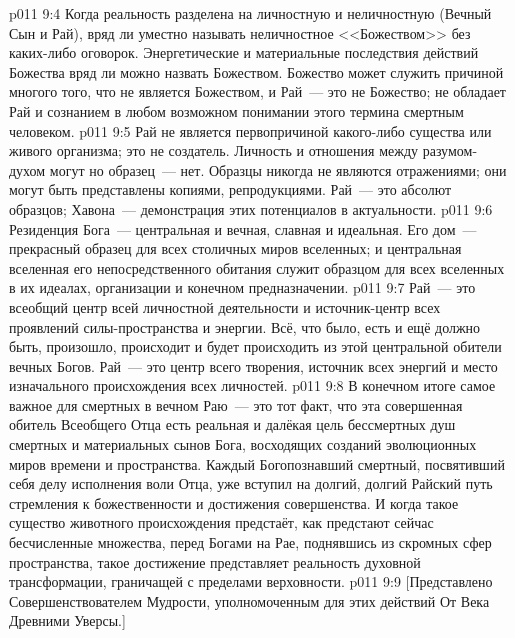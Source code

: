 \vs p011 9:4 Когда реальность разделена на личностную и неличностную (Вечный Сын и Рай), вряд ли уместно называть неличностное <<Божеством>> без каких\hyp{}либо оговорок. Энергетические и материальные последствия действий Божества вряд ли можно назвать Божеством. Божество может служить причиной многого того, что не является Божеством, и Рай~--- это не Божество; не обладает Рай и сознанием в любом возможном понимании этого термина смертным человеком.
\vs p011 9:5 \pc Рай не является первопричиной какого\hyp{}либо существа или живого организма; это не создатель. Личность и отношения между разумом\hyp{}духом могут  но образец~--- нет. Образцы никогда не являются отражениями; они могут быть представлены копиями, репродукциями. Рай~--- это абсолют образцов; Хавона~--- демонстрация этих потенциалов в актуальности.
\vs p011 9:6 \pc Резиденция Бога~--- центральная и вечная, славная и идеальная. Его дом~--- прекрасный образец для всех столичных миров вселенных; и центральная вселенная его непосредственного обитания служит образцом для всех вселенных в их идеалах, организации и конечном предназначении.
\vs p011 9:7 Рай~--- это всеобщий центр всей личностной деятельности и источник\hyp{}центр всех проявлений силы\hyp{}пространства и энергии. Всё, что было, есть и ещё должно быть, произошло, происходит и будет происходить из этой центральной обители вечных Богов. Рай~--- это центр всего творения, источник всех энергий и место изначального происхождения всех личностей.
\vs p011 9:8 \pc В конечном итоге самое важное для смертных в вечном Раю~--- это тот факт, что эта совершенная обитель Всеобщего Отца есть реальная и далёкая цель бессмертных душ смертных и материальных сынов Бога, восходящих созданий эволюционных миров времени и пространства. Каждый Богопознавший смертный, посвятивший себя делу исполнения воли Отца, уже вступил на долгий, долгий Райский путь стремления к божественности и достижения совершенства. И когда такое существо животного происхождения предстаёт, как предстают сейчас бесчисленные множества, перед Богами на Рае, поднявшись из скромных сфер пространства, такое достижение представляет реальность духовной трансформации, граничащей с пределами верховности.
\vsetoff
\vs p011 9:9 [Представлено Совершенствователем Мудрости, уполномоченным для этих действий От Века Древними Уверсы.]
\quizlink
